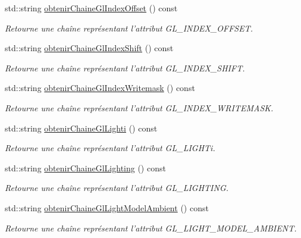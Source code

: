 \begin{DoxyCompactItemize}
std\-::string \hyperlink{group__utilitaire_ga2ef77a1752dfc7df305e66d9ebc8fee0}{obtenir\-Chaine\-Gl\-Index\-Offset} () const 
\begin{DoxyCompactList}\small\item\em Retourne une chaîne représentant l'attribut G\-L\-\_\-\-I\-N\-D\-E\-X\-\_\-\-O\-F\-F\-S\-E\-T. \end{DoxyCompactList}\item 
std\-::string \hyperlink{group__utilitaire_gabb665544045af095c7c301467b71a53d}{obtenir\-Chaine\-Gl\-Index\-Shift} () const 
\begin{DoxyCompactList}\small\item\em Retourne une chaîne représentant l'attribut G\-L\-\_\-\-I\-N\-D\-E\-X\-\_\-\-S\-H\-I\-F\-T. \end{DoxyCompactList}\item 
std\-::string \hyperlink{group__utilitaire_ga7041e09cfd847b59e2fd8b306639b2e2}{obtenir\-Chaine\-Gl\-Index\-Writemask} () const 
\begin{DoxyCompactList}\small\item\em Retourne une chaîne représentant l'attribut G\-L\-\_\-\-I\-N\-D\-E\-X\-\_\-\-W\-R\-I\-T\-E\-M\-A\-S\-K. \end{DoxyCompactList}\item 
std\-::string \hyperlink{group__utilitaire_ga373300784f0f42aea9a0d6c78cb01623}{obtenir\-Chaine\-Gl\-Lighti} () const 
\begin{DoxyCompactList}\small\item\em Retourne une chaîne représentant l'attribut G\-L\-\_\-\-L\-I\-G\-H\-Ti. \end{DoxyCompactList}\item 
std\-::string \hyperlink{group__utilitaire_gac26fe35af4bad0a50b4890f21e61ea02}{obtenir\-Chaine\-Gl\-Lighting} () const 
\begin{DoxyCompactList}\small\item\em Retourne une chaîne représentant l'attribut G\-L\-\_\-\-L\-I\-G\-H\-T\-I\-N\-G. \end{DoxyCompactList}\item 
std\-::string \hyperlink{group__utilitaire_gafee564b101971fe6c901050b13522dc7}{obtenir\-Chaine\-Gl\-Light\-Model\-Ambient} () const 
\begin{DoxyCompactList}\small\item\em Retourne une chaîne représentant l'attribut G\-L\-\_\-\-L\-I\-G\-H\-T\-\_\-\-M\-O\-D\-E\-L\-\_\-\-A\-M\-B\-I\-E\-N\-T. \end{DoxyCompactList}\item 

\end{DoxyCompactItemize}
